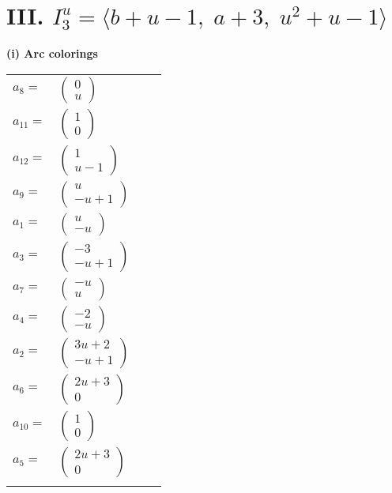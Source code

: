 \documentclass[1p]{elsarticle_modified}
\theoremstyle{definition}
\begin{document}
\centering \section*{III. $I^u_{3}= \langle b+u-1,\;a+3,\;u^2+u-1 \rangle$}
\flushleft \textbf{(i) Arc colorings}\\
\begin{tabular}{m{7pt} m{180pt} m{7pt} m{180pt} }
\flushright $a_{8}=$&$\begin{pmatrix}0\\u\end{pmatrix}$ \\
\flushright $a_{11}=$&$\begin{pmatrix}1\\0\end{pmatrix}$ \\
\flushright $a_{12}=$&$\begin{pmatrix}1\\u-1\end{pmatrix}$ \\
\flushright $a_{9}=$&$\begin{pmatrix}u\\- u+1\end{pmatrix}$ \\
\flushright $a_{1}=$&$\begin{pmatrix}u\\- u\end{pmatrix}$ \\
\flushright $a_{3}=$&$\begin{pmatrix}-3\\- u+1\end{pmatrix}$ \\
\flushright $a_{7}=$&$\begin{pmatrix}- u\\u\end{pmatrix}$ \\
\flushright $a_{4}=$&$\begin{pmatrix}-2\\- u\end{pmatrix}$ \\
\flushright $a_{2}=$&$\begin{pmatrix}3 u+2\\- u+1\end{pmatrix}$ \\
\flushright $a_{6}=$&$\begin{pmatrix}2 u+3\\0\end{pmatrix}$ \\
\flushright $a_{10}=$&$\begin{pmatrix}1\\0\end{pmatrix}$ \\
\flushright $a_{5}=$&$\begin{pmatrix}2 u+3\\0\end{pmatrix}$\\&\end{tabular}
\end{document}
